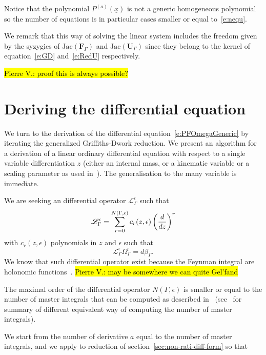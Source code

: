 \documentclass[a4paper,12pt]{article}
\numberwithin{equation}{section}
\numberwithin{figure}{section}
\newcommand{\pvnote}[1]{\sethlcolor{bubblegum} \protect\hl{Pierre V.: #1} \sethlcolor{yellow}}
\begin{document}
Notice that the polynomial $P^{(a)}(\underline x)$ is not a generic
homogeneous polynomial so the number of equations is in particular
cases smaller or equal to~\eqref{e:nequ}.


We remark that this way of solving the linear system includes the
freedom given by the syzygies of $\textrm{Jac}(\textbf{F}_\Gamma)$ and
$\textrm{Jac}(\textbf{U}_\Gamma)$ since they belong to
the kernel of equation~\eqref{e:GD} and~\eqref{e:RedU} respectively.


\pvnote{proof this is always possible?}

\section{Deriving the differential equation}
\label{sec:deriv-diff-equat}

We turn to the derivation of the differential
equation~\eqref{e:PFOmegaGeneric}  by iterating the generalized
Griffiths-Dwork reduction. We present an algorithm for a derivation of
a linear ordinary differential equation with respect to a single
variable differentiation $z$ (either an internal mass, or a kinematic
variable or a scaling parameter as used
in~\cite{Lairez:2022zkj,Doran:2023yzu}). The generalisation to the
many variable is immediate.

We are seeking an differential operator $\mathscr{L}_\Gamma^\epsilon$
such that
\begin{equation}\label{e:PFgeneric}
  \mathscr{L}_\Gamma^\epsilon=\sum_{r=0}^{N(\Gamma,\epsilon)}
  c_r(z,\epsilon) \left(d\over dz\right)^r
\end{equation}
with $c_r(z,\epsilon)$ polynomials in $z$ and $\epsilon$ such that
\begin{equation}
     \mathscr{L}_\Gamma^\epsilon \Omega_\Gamma^\epsilon= d\beta_\Gamma.
   \end{equation}
We know that such differential operator exist because the Feynman
integral are holonomic
functions~\cite{Smirnov:2010hn,Bitoun:2017nre,Lee:2013hzt}.
\pvnote{may be somewhere we can quite Gel'fand}


   The maximal order of the differential operator
$N(\Gamma,\epsilon)$ is smaller or equal to the number of master
integrals that can be computed as described
in~\cite{Bitoun:2017nre,Lee:2013hzt} (see~\cite{Agostini:2022cgv} for
summary of different equivalent way of computing the number of master integrals).

We start from the number of derivative $a$ equal to the
number of master integrals, and we apply to reduction of
section~\ref{sec:non-rati-diff-form} so that
\end{document}
